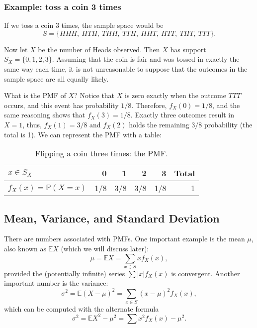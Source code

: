 \subsubsection{Example: toss a coin 3 times}
\label{exa-Toss-a-coin}
If we toss a coin 3 times, the sample space would be \[
S=\{ HHH,\ HTH,\ THH,\ TTH,\ HHT,\ HTT,\ THT,\ TTT\}.  \]

Now let \(X\) be the number of Heads observed. Then \(X\) has support
\(S_{X}=\{ 0,1,2,3\} \). Assuming that the coin is fair and was tossed
in exactly the same way each time, it is not unreasonable to suppose
that the outcomes in the sample space are all equally likely.

What is the PMF of \(X\)? Notice that \(X\) is zero exactly when the
outcome \(TTT\) occurs, and this event has probability
\(1/8\). Therefore, \(f_{X}(0)=1/8\), and the same reasoning shows
that \(f_{X}(3)=1/8\). Exactly three outcomes result in \(X=1\), thus,
\(f_{X}(1)=3/8\) and \(f_{X}(2)\) holds the remaining \(3/8\)
probability (the total is 1). We can represent the PMF with a table:

\begin{table}[htb]
\caption[Flipping a coin three times]{\label{tab-pmf-flip-coin-three}Flipping a coin three times: the PMF.}
\centering
\begin{tabular}{lrrrrr}
\(x\in S_{X}\) & 0 & 1 & 2 & 3 & Total\\
\hline
\(f_{X}(x)=\mathbb{P}(X=x)\) & 1/8 & 3/8 & 3/8 & 1/8 & 1\\
\end{tabular}
\end{table}

\subsection{Mean, Variance, and Standard Deviation}
\label{sec-5-1-2}

There are numbers associated with PMFs. One important example is the
mean \(\mu\), also known as \(\mathbb{E} X\) (which we will discuss
later):
\begin{equation}
\mu=\mathbb{E} X=\sum_{x\in S}xf_{X}(x),
\end{equation}
provided the (potentially infinite) series \(\sum|x|f_{X}(x)\) is convergent. Another important number is the variance:
\begin{equation}
\sigma^{2}=\mathbb{E}(X-\mu)^2=\sum_{x\in S}(x-\mu)^{2}f_{X}(x),
\end{equation}
which can be computed with the alternate formula
\[ \sigma^{2}=\mathbb{E}X^2-\mu^2=\sum x{}^{2}f_{X}(x)-\mu^{2} .\]

